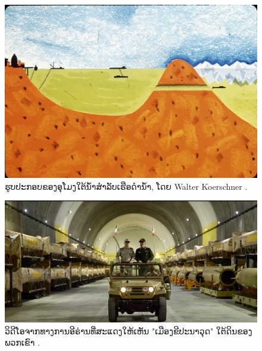 \documentclass[10pt,twocolumn,letterpaper]{article}
\begin{document}
\begin{figure}[t]
\begin{center}
   \includegraphics[width=1\linewidth]{sub.jpg}
\end{center}
   \caption{ຮູບປະກອບຂອງອຸໂມງໃຕ້ນ້ຳສຳລັບເຮືອດຳນ້ຳ, ໂດຍ Walter Koerschner \cite{22,23}.}
\label{fig:6}
\label{fig:onecol}
\end{figure}

\begin{figure}[t]
\begin{center}
   \includegraphics[width=1\linewidth]{iran.jpeg}
\end{center}
   \caption{ວິດີໂອຈາກທາງການອີຣ່ານທີ່ສະແດງໃຫ້ເຫັນ "ເມືອງຂີປະນາວຸດ" ໃຕ້ດິນຂອງພວກເຂົາ \cite{39,40}.}
\label{fig:12}
\label{fig:onecol}
\end{figure}
\end{document}
